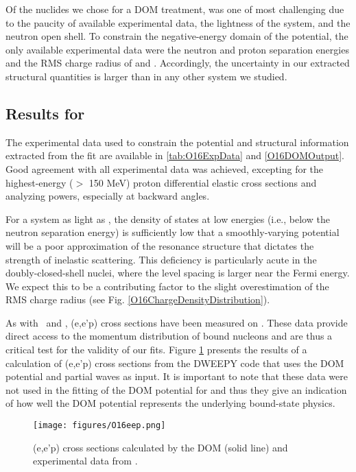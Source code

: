 Of the nuclides we chose for a DOM treatment, \oEight was one of most challenging due to the paucity of
available experimental data, the lightness of the system, and the neutron open shell.
To constrain the negative-energy domain
of the potential, the only available experimental data were the neutron and proton separation
energies and the RMS charge radius of \oEight and \neEight. Accordingly, the uncertainty in our
extracted structural quantities is larger than in any other system we studied.

\subsection{Results for \oSix}
The experimental data used to constrain the \oSix potential and structural information extracted
from the fit are available in \ref{tab:O16ExpData} and \ref{O16DOMOutput}. Good agreement with all 
experimental data was achieved, excepting for the highest-energy ($>$ 150 MeV)
proton differential elastic cross sections and analyzing powers, especially at backward angles.

For a system as light as \oSix, the density of states at low energies (i.e., below the neutron
separation energy) is sufficiently low that a smoothly-varying potential will be a poor
approximation of the resonance structure that dictates the strength of inelastic scattering. This
deficiency is particularly acute in the doubly-closed-shell nuclei, where the level spacing is
larger near the Fermi energy. We expect this to be a contributing factor to the slight
overestimation of the RMS charge radius (see Fig. \ref{O16ChargeDensityDistribution}).

As with \caForty\ and \pbEight, (e,e'p) cross sections have been measured on \oSix. These data
provide direct access to the momentum distribution of bound nucleons and are thus a critical test
for the validity of our fits. Figure \ref{O16eep} presents the results of a calculation of (e,e'p)
cross sections from the DWEEPY code \cite{DWEEPY} that uses the DOM potential and partial waves as input.
It is important to note that these data were not used in the fitting of the DOM potential for \oSix
and thus they give an indication of how well the DOM potential represents the underlying bound-state
physics.

\begin{figure}[ht!]
    \centering
    \texttt{[image: figures/O16eep.png]}
    \caption[\oSix (e,e'p) cross sections calculated by the DOM]
    {
        \oSix (e,e'p) cross sections calculated by the DOM (solid line) and experimental data from
        \cite{Leuschner1994}.
    }
    \label{O16eep}
\end{figure}

